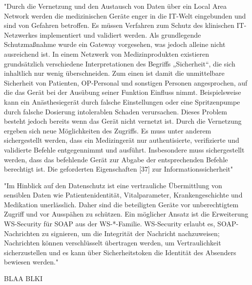 	"Durch die Vernetzung und den Austausch von Daten über ein Local Area Network
	werden die medizinischen Geräte enger in die IT-Welt eingebunden und sind von
	Gefahren betroffen. Es müssen Verfahren zum Schutz des klinischen IT-Netzwerkes
	implementiert und validiert werden. Als grundlegende Schutzmaßnahme wurde ein
	Gateway vorgesehen, was jedoch alleine nicht ausreichend ist. In einem Netzwerk von
	Medizinprodukten existieren grundsätzlich verschiedene Interpretationen des Begriffs
	„Sicherheit“, die sich inhaltlich nur wenig überschneiden. Zum einen ist damit die
	unmittelbare Sicherheit von Patienten, OP-Personal und sonstigen Personen angesprochen,
	auf die das Gerät bei der Ausübung seiner Funktion Einfluss nimmt. Beispielsweise
	kann ein Anästhesiegerät durch falsche Einstellungen oder eine Spritzenpumpe
	durch falsche Dosierung intolerablen Schaden verursachen. Dieses Problem besteht
	jedoch bereits wenn das Gerät nicht vernetzt ist. Durch die Vernetzung ergeben sich
	neue Möglichkeiten des Zugriffs. Es muss unter anderem sichergestellt werden, dass
	ein Medizingerät nur authentisierte, verifizierte und validierte Befehle entgegennimmt
	und ausführt. Insbesondere muss sichergestellt werden, dass das befehlende Gerät zur
	Abgabe der entsprechenden Befehle berechtigt ist.
	Die geforderten Eigenschaften [37] zur Informationssicherheit"
	
	"Im Hinblick auf den Datenschutz ist eine vertrauliche
	Übermittlung von sensiblen Daten wie Patientenidentität, Vitalparameter,
	Krankengeschichte und Medikation unerlässlich. Daher sind die beteiligten Geräte
	vor unberechtigtem Zugriff und vor Ausspähen zu schützen. Ein möglicher Ansatz ist
	die Erweiterung WS-Security für SOAP aus der WS-*-Familie. WS-Security erlaubt es,
	SOAP-Nachrichten zu signieren, um die Integrität der Nachricht nachzuweisen; Nachrichten
	können verschlüsselt übertragen werden, um Vertraulichkeit sicherzustellen
	und es kann über Sicherheitstoken die Identität des Absenders bewiesen werden."
	
	BLAA BLKI